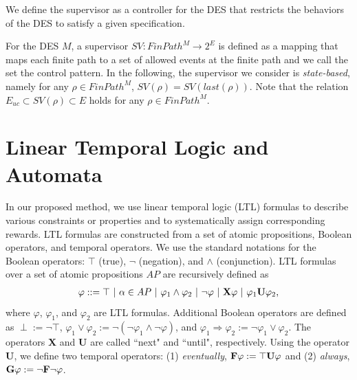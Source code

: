 \documentclass[a4j,12pt,oneside,openany,english]{jsbook}
\begin{document}
We define the supervisor as a controller for the DES that restricts the behaviors of the DES to satisfy a given specification.

\begin{definition}
For the DES $M$,  a supervisor $SV : FinPath^{M} \rightarrow 2^E$ is defined as a mapping that maps each finite path to a set of allowed events at the finite path and we call the set the control pattern. In the following, the supervisor we consider is {\it state-based}, namely for any $\rho \in FinPath^{M}$, $SV(\rho) = SV(last(\rho))$. Note that the relation $E_{uc} \subset SV(\rho) \subset E$ holds for any $\rho \in FinPath^M$.
\end{definition}

\section{Linear Temporal Logic and Automata}

In our proposed method, we use linear temporal logic (LTL) formulas to describe various constraints or properties and to systematically assign corresponding rewards.
LTL formulas are constructed from a set of atomic propositions, Boolean operators, and temporal operators. We use the standard notations for the Boolean operators: $\top$ (true), $\neg$ (negation), and $\land$ (conjunction).
LTL formulas over a set of atomic propositions $AP$ are recursively defined as
\begin{align*}
  \varphi ::=\top\ |\ \alpha \in AP\ |\ \varphi_1 \land \varphi_2\ |\ \neg \varphi\ |\ \text{{\bf X}} \varphi\ |\ \varphi_1 \text{{\bf U}} \varphi_2,
\end{align*}
where $\varphi$, $\varphi_1$, and $\varphi_2$ are LTL formulas.
Additional Boolean operators are defined as $\perp := \neg \top $, $\varphi_1 \lor \varphi_2 := \neg(\neg \varphi_1 \land \neg \varphi)$, and $\varphi_1 \Rightarrow \varphi_2 := \neg \varphi_1 \lor \varphi_2$.
The operators {\bf X} and {\bf U} are called ``next" and ``until", respectively.
Using the operator {\bf U}, we define two temporal operators: (1) {\it eventually}, $\text{{\bf F}} \varphi := \top \text{{\bf U}} \varphi $ and (2) {\it always}, $\text{{\bf G}} \varphi := \neg \text{{\bf F}} \neg \varphi$.
\end{document}
